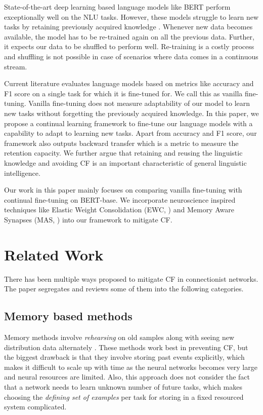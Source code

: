 \documentclass[11pt,a4paper]{article}
\begin{document}
State-of-the-art deep learning based language models like BERT \cite{DBLP:journals/corr/abs-1810-04805} perform exceptionally well on the NLU tasks.  However, these models struggle to learn new tasks by retaining previously acquired knowledge \cite{DBLP:journals/corr/abs-1901-11373}.  Whenever new data becomes available, the model has to be re-trained again on all the previous data.  Further, it expects our data to be shuffled to perform well.  Re-training is a costly process and shuffling is not possible in case of scenarios where data comes in a continuous stream.

Current literature evaluates language models based on metrics like accuracy and F1 score on a single task for which it is fine-tuned for.  We call this as vanilla fine-tuning.  Vanilla fine-tuning does not measure adaptability of our model to learn new tasks without forgetting the previously acquired knowledge.  In this paper, we propose a continual learning framework to fine-tune our language models with a capability to adapt to learning new tasks. Apart from accuracy and F1 score, our framework also outputs backward transfer \citeauthor{DBLP:journals/corr/Lopez-PazR17} which is a metric to measure the retention capacity.  We further argue that retaining and reusing the linguistic knowledge and avoiding CF is an important characteristic of general linguistic intelligence.  

Our work in this paper mainly focuses on comparing vanilla fine-tuning with continual fine-tuning on BERT-base. We incorporate neuroscience inspired techniques like Elastic Weight Consolidation  (EWC, \citealt{DBLP:journals/corr/KirkpatrickPRVD16}) and Memory Aware Synapses  (MAS, \citealt{aljundi2018memory}) into our framework to mitigate CF.

\section{Related Work}
\label{sec:related}

There has been multiple ways proposed to mitigate CF in connectionist networks. The paper segregates and reviews some of them into the following categories.

\subsection{Memory based methods}
Memory methods involve \textit{rehearsing} on old samples along with seeing new distribution data alternately \cite{Robins1995CatastrophicFR, Gepperth2016ABI}. These methods work best in preventing CF, but the biggest drawback is that they involve storing past events explicitly, which makes it difficult to scale up with time as the neural networks becomes very large and neural resources are limited.
Also, this approach does not consider the fact that a network needs to learn unknown number of future tasks, which makes choosing the \textit{defining set of examples} per task for storing in a fixed resourced system complicated.
\end{document}
